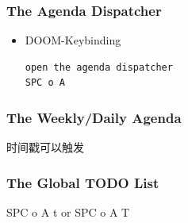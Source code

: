 \documentclass[11pt]{article}
\begin{document}
\subsubsection{The Agenda Dispatcher}
\label{sec:org1e77462}
\begin{itemize}
\item DOOM-Keybinding
\begin{verbatim}
open the agenda dispatcher
SPC o A
\end{verbatim}
\end{itemize}
\subsubsection{The Weekly/Daily Agenda}
\label{sec:org3300975}
时间戳可以触发
\subsubsection{The Global TODO List}
\label{sec:org493f306}
SPC o A t or SPC o A T
\end{document}
